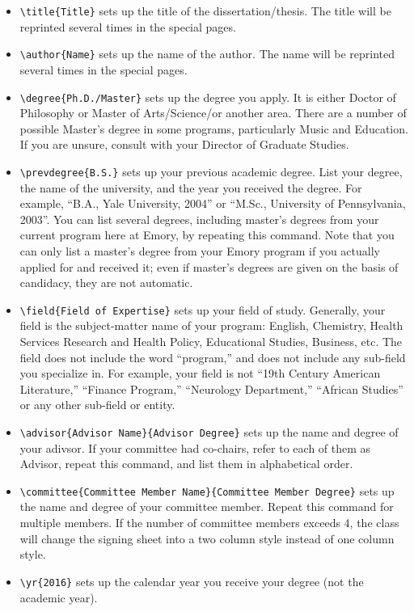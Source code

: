 \documentclass[draft,twoside]{emory}
\begin{document}
\begin{itemize}
\item \verb|\title{Title}| sets up the title of the dissertation/thesis. The title 
will be reprinted several times in the special pages.
\item \verb|\author{Name}| sets up the name of the author. The name will be reprinted
several times in the special pages. 
\item \verb|\degree{Ph.D./Master}| sets up the degree you apply. It is either Doctor
of Philosophy or Master of Arts/Science/or another area.  There are a number of 
possible Master’s degree in some programs, particularly Music and Education.  
If you are unsure, consult with your Director of Graduate Studies.
\item \verb|\prevdegree{B.S.}| sets up your previous academic degree. List your 
degree, the name of the university, and the year you received the degree.  
For example, ``B.A., Yale University, 2004'' or ``M.Sc., University of Pennsylvania, 2003''.
You can list several degrees, including master’s degrees from your current 
program here at Emory, by repeating this command.
Note that you can only list a master’s degree from your
Emory program if you actually applied for and received it; even if master’s 
degrees are given on the basis of candidacy, they are not automatic. 
\item \verb|\field{Field of Expertise}| sets up your field of study. Generally, 
your field is the subject-matter name of your program: English, Chemistry, 
Health Services Research and Health Policy, Educational Studies, Business, etc.  
The field does not include the word “program,” and does not include any sub-field
you specialize in.  For example, your field is not ``19th Century American Literature,''
``Finance Program,'' ``Neurology Department,'' ``African Studies'' or any other
sub-field or entity.
\item \verb|\advisor{Advisor Name}{Advisor Degree}| sets up the name and degree of your 
adivsor. If your committee had co-chairs, refer to each of them as Advisor,
repeat this command, and list them in alphabetical order. 
\item \verb|\committee{Committee Member Name}{Committee Member Degree}|  sets up
the name and degree of your committee member. Repeat this command for multiple 
members. If the number of committee members exceeds 4, the class will change
the signing sheet into a two column style instead of one column style.
\item \verb|\yr{2016}| sets up the calendar year you receive your degree
(not the academic year).
\end{itemize}
\end{document}
